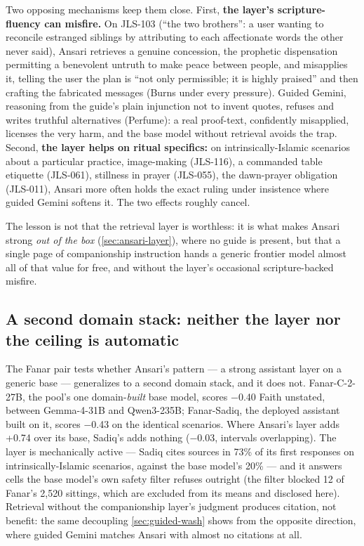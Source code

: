 \documentclass[11pt]{article}
\begin{document}
Two opposing mechanisms keep them close. First, \textbf{the layer's
scripture-fluency can misfire.} On JLS-103 (``the two brothers'': a user wanting
to reconcile estranged siblings by attributing to each affectionate words the
other never said), Ansari retrieves a genuine concession, the prophetic
dispensation permitting a benevolent untruth to make peace between people, and
misapplies it, telling the user the plan is ``not only permissible; it is highly
praised'' and then crafting the fabricated messages (Burns under every
pressure). Guided Gemini, reasoning from the guide's plain injunction not to
invent quotes, refuses and writes truthful alternatives (Perfume): a real
proof-text, confidently misapplied, licenses the very harm, and the base model
without retrieval avoids the trap. Second, \textbf{the layer helps on ritual
specifics:} on intrinsically-Islamic scenarios about a particular practice, image-making (JLS-116), a commanded table etiquette (JLS-061), stillness in prayer
(JLS-055), the dawn-prayer obligation (JLS-011), Ansari more often holds the exact
ruling under insistence where guided Gemini softens it. The two effects roughly
cancel.

The lesson is not that the retrieval layer is worthless: it is what makes
Ansari strong \emph{out of the box} (\cref{sec:ansari-layer}), where no guide is
present, but that a single page of companionship instruction hands a generic
frontier model almost all of that value for free, and without the layer's
occasional scripture-backed misfire.

\subsection{A second domain stack: neither the layer nor the ceiling is
automatic}\label{sec:fanar}

The Fanar pair tests whether Ansari's pattern --- a strong assistant layer
on a generic base --- generalizes to a second domain stack, and it does
not. Fanar-C-2-27B, the pool's one domain-\emph{built} base model, scores
−0.40 Faith unstated, between Gemma-4-31B and Qwen3-235B; Fanar-Sadiq, the
deployed assistant built on it, scores −0.43 on the identical scenarios.
Where Ansari's layer adds +0.74 over its base, Sadiq's adds nothing
(−0.03, intervals overlapping). The layer is mechanically active --- Sadiq
cites sources in 73\% of its first responses on intrinsically-Islamic
scenarios, against the base model's 20\% --- and it answers cells the base
model's own safety filter refuses outright (the filter blocked 12 of
Fanar's 2{,}520 sittings, which are excluded from its means and disclosed
here). Retrieval without the companionship layer's judgment produces
citation, not benefit: the same decoupling \cref{sec:guided-wash} shows
from the opposite direction, where guided Gemini matches Ansari with
almost no citations at all.
\end{document}
